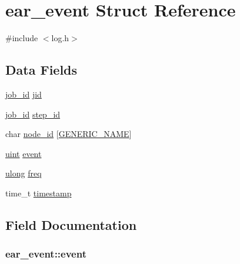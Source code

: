\hypertarget{structear__event}{}\section{ear\+\_\+event Struct Reference}
\label{structear__event}


{\ttfamily \#include $<$log.\+h$>$}

\subsection*{Data Fields}
\begin{DoxyCompactItemize}
\item 
\hyperlink{generic_8h_aa17a8e6cdc1860741119dc46c1777778}{job\+\_\+id} \hyperlink{structear__event_a309c896c171c9ce468dc576d65c051a4}{jid}
\item 
\hyperlink{generic_8h_aa17a8e6cdc1860741119dc46c1777778}{job\+\_\+id} \hyperlink{structear__event_ab5788e6f70b95d710f14392ef6f5ae74}{step\+\_\+id}
\item 
char \hyperlink{structear__event_a9b7eae0e514fd7c3135409479bd4e6d0}{node\+\_\+id} \mbox{[}\hyperlink{loop_8h_a6b0b8b14cfc75447be8feba3efe18da8}{G\+E\+N\+E\+R\+I\+C\+\_\+\+N\+A\+ME}\mbox{]}
\item 
\hyperlink{generic_8h_a91ad9478d81a7aaf2593e8d9c3d06a14}{uint} \hyperlink{structear__event_a4493e430ea3c205b4e84d625210a7f09}{event}
\item 
\hyperlink{generic_8h_a718b4eb2652c286f4d42dc18a8e71a1a}{ulong} \hyperlink{structear__event_aedf43a51d14908b79e030af38a20a70c}{freq}
\item 
time\+\_\+t \hyperlink{structear__event_a2d3079e677c19bbe769dcb0472627d4f}{timestamp}
\end{DoxyCompactItemize}


\subsection{Field Documentation}
\subsubsection[{\texorpdfstring{event}{event}}]{ ear\+\_\+event\+::event}\hypertarget{structear__event_a4493e430ea3c205b4e84d625210a7f09}{}\label{structear__event_a4493e430ea3c205b4e84d625210a7f09}
